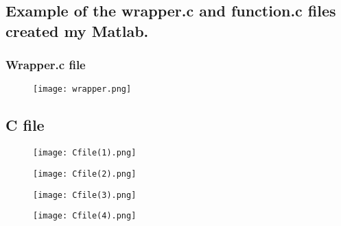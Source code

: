 \documentclass{article}
\begin{document}
\subsection*{Example of the wrapper.c and function.c files created my Matlab.}
\subsubsection*{Wrapper.c file}
\begin{figure}[H]
    \centering
    \texttt{[image: wrapper.png]}
    \label{fig:my_label}
\end{figure}
\subsection*{C file}
\begin{figure}[H]
    \centering
    \texttt{[image: Cfile(1).png]}
    \label{fig:my_label}
\end{figure}
\begin{figure}[H]
    \centering
    \texttt{[image: Cfile(2).png]}
    \label{fig:my_label}
\end{figure}
\begin{figure}[H]
    \centering
    \texttt{[image: Cfile(3).png]}
    \label{fig:my_label}
\end{figure}
\begin{figure}[H]
    \centering
    \texttt{[image: Cfile(4).png]}
    \label{fig:my_label}
\end{figure}
\end{document}
